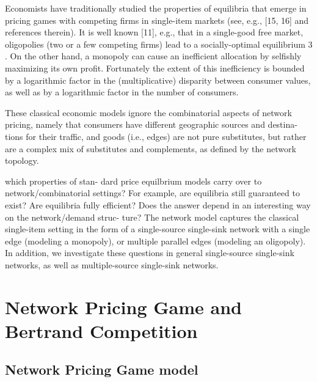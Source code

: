 \documentclass{beamer}
\begin{document}
\begin{frame}
Economists have traditionally studied the properties of equilibria that emerge
in pricing games with competing firms in single-item markets (see, e.g., [15, 16]
and references therein). It is well known [11], e.g., that in a single-good free
market, oligopolies (two or a few competing firms) lead to a socially-optimal
equilibrium 3 . On the other hand, a monopoly can cause an inefficient allocation
by selfishly maximizing its own profit. Fortunately the extent of this inefficiency
is bounded by a logarithmic factor in the (multiplicative) disparity between
consumer values, as well as by a logarithmic factor in the number of consumers.

These classical economic models ignore the combinatorial aspects of network
pricing, namely that consumers have different geographic sources and destina-
tions for their traffic, and goods (i.e., edges) are not pure substitutes, but rather
are a complex mix of substitutes and complements, as defined by the network
topology.
\end{frame}


\begin{frame}
which properties of stan-
dard price equilbrium models carry over to network/combinatorial settings? For
example, are equilibria still guaranteed to exist? Are equilibria fully efficient?
Does the answer depend in an interesting way on the network/demand struc-
ture? The network model captures the classical single-item setting in the form of
a single-source single-sink network with a single edge (modeling a monopoly), or
multiple parallel edges (modeling an oligopoly). In addition, we investigate these
questions in general single-source single-sink networks, as well as multiple-source
single-sink networks.
\end{frame}



\section{Network Pricing Game and Bertrand Competition}

\subsection{Network Pricing Game model}
\end{document}
